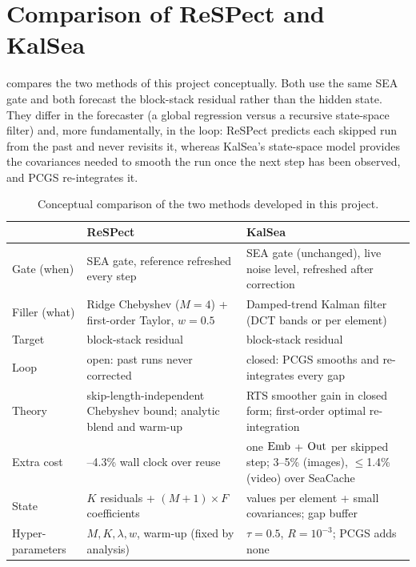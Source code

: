 \section{Comparison of ReSPect and KalSea}\label{sec:kalsea-compare}

 compares the two methods of this project conceptually. Both use the same SEA gate and both forecast the block-stack residual rather than the hidden state. They differ in the forecaster (a global regression versus a recursive state-space filter) and, more fundamentally, in the loop: ReSPect predicts each skipped run from the past and never revisits it, whereas KalSea's state-space model provides the covariances needed to smooth the run once the next step has been observed, and PCGS re-integrates it.

\begin{table}[t]
  \centering
  \small
  \caption[Conceptual comparison of ReSPect and KalSea]{Conceptual comparison of the two methods developed in this project.}
  \label{tab:kalsea-compare}
  \begin{tabularx}{\textwidth}{@{}l>{\raggedright\arraybackslash}X>{\raggedright\arraybackslash}X@{}}
    \toprule
    & ReSPect & KalSea \\
    \midrule
    Gate (when) & SEA gate, reference refreshed every step & SEA gate (unchanged), live noise level, refreshed after correction \\
    Filler (what) & Ridge Chebyshev ($M{=}4$) + first-order Taylor, $w{=}0.5$ & Damped-trend Kalman filter (DCT bands or per element) \\
    Target & block-stack residual & block-stack residual \\
    Loop & open: past runs never corrected & closed: PCGS smooths and re-integrates every gap \\
    Theory & skip-length-independent Chebyshev bound; analytic blend and warm-up & RTS smoother gain in closed form; first-order optimal re-integration \\
    Extra cost & 1.7--4.3\% wall clock over reuse & one $\mathrm{Emb}$ + $\mathrm{Out}$ per skipped step; 3--5\% (images), $\le$1.4\% (video) over SeaCache \\
    State & $K$ residuals + $(M{+}1)\times F$ coefficients & 2 values per element + small covariances; gap buffer \\
    Hyper-parameters & $M,K,\lambda,w$, warm-up (fixed by analysis) & $\tau{=}0.5$, $R{=}10^{-3}$; PCGS adds none \\
    \bottomrule
  \end{tabularx}
\end{table}

